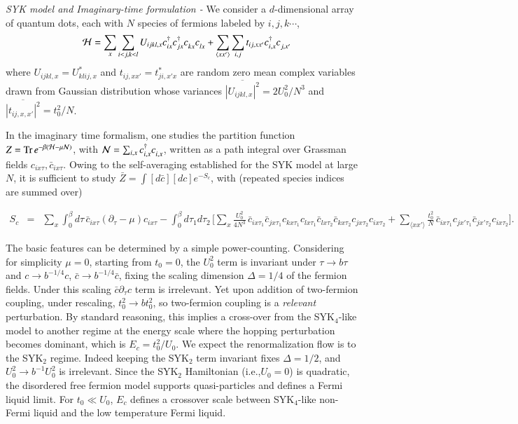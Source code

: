 \documentclass[twocolumn,floatfix,superscriptaddress]{revtex4-1}
\newcommand{\ket}{\rangle}
\newcommand{\bra}{\langle}
\begin{document}
\emph{SYK model and Imaginary-time formulation - }  We consider a $d$-dimensional array of quantum dots, each with  $N$ species of fermions labeled by $i,j,k\cdots$, 
\begin{eqnarray}
\label{hamiltonian}
&&\mathcal H=\sum_x \sum_{i<j,k<l} U_{ijkl,x}c_{ix}^\dagger c_{jx}^\dagger c^{\vphantom\dagger}_{kx}c^{\vphantom\dagger}_{lx}+\sum_{\bra xx'\ket} \sum_{i,j}t_{ij,xx'} c_{i,x}^\dagger c^{\vphantom\dagger}_{j,x'}
\end{eqnarray}
where $U_{ijkl,x}=U_{klij,x}^*$ and $t_{ij,xx'}=t_{ji,x'x}^*$ are random zero mean complex variables drawn from Gaussian distribution whose variances $\overline{|U_{ijkl,x}|^2} = 2 U_0^2/N^3$ and $\overline {|t_{ij,x,x'}|^2} = t_0^2/N$.  

In the imaginary time formalism, one studies the partition function $Z={\rm Tr}\, e^{-\beta (\mathcal{H}-\mu \mathcal{N})}$,  with $\mathcal{N} = \sum_{i,x} c_{i,x}^\dagger c_{i,x}^{\vphantom\dagger}$, written as a path integral over Grassman fields  $c_{ix\tau},\bar c_{ix\tau}$.  Owing to the self-averaging established for the SYK model at large $N$, it is sufficient to study $\bar{Z}= \int [d\bar{c}][dc] e^{-S_c}$, with (repeated species indices are summed over)
\begin{widetext}
  \begin{eqnarray}
    \label{eq:1}
    S_c & = & \sum_{x}\int_0^\beta \! d\tau \, \bar c_{ix\tau}(\partial_\tau - \mu) c_{ix\tau} - \int_0^\beta \! d\tau_1 d\tau_2 \,\Big[ \sum_x\frac{U_0^2}{4N^3} \,\bar{c}_{ix\tau_1} \bar{c}_{jx\tau_1}  c_{kx\tau_1} c_{lx\tau_1} \bar{c}_{lx\tau_2} \bar{c}_{kx\tau_2} c_{jx\tau_2} c_{ix\tau_2}  +\sum_{\bra xx'\ket} \frac{t_0^2}{N} \, \bar{c}_{ix\tau_1} c_{jx'\tau_1} \bar{c}_{jx'\tau_2} c_{ix\tau_2} \Big].
  \end{eqnarray}
\end{widetext}
The basic features can be determined by a simple power-counting.  Considering for simplicity $\mu=0$, starting from $t_0=0$, the $U_0^2$ term is invariant under $\tau \rightarrow b \tau$ and $c \rightarrow b^{-1/4} c$, $\bar{c}\rightarrow b^{-1/4} \bar{c}$, fixing the scaling dimension $\Delta=1/4$ of the fermion fields.  Under this scaling $\bar{c}\partial_\tau c$ term is irrelevant. Yet upon addition of two-fermion coupling, under rescaling, $t_0^2 \rightarrow b t_0^2$, so two-fermion coupling is a {\em relevant} perturbation.  By standard reasoning, this implies a cross-over from the SYK$_4$-like model to another regime at the energy scale where the hopping perturbation becomes dominant, which is $E_c = t_0^2/U_0$.  We expect the renormalization flow is to the SYK$_2$ regime.  Indeed keeping the SYK$_2$ term invariant fixes $\Delta = 1/2$, and $U_0^2 \rightarrow b^{-1} U_0^2$ is irrelevant.  Since the SYK$_2$ Hamiltonian (i.e.,$U_0=0$) is quadratic, the disordered free fermion model supports quasi-particles and defines a Fermi liquid limit.  For $t_0 \ll U_0$, $E_c$ defines a crossover scale between SYK$_4$-like non-Fermi liquid and the low temperature Fermi liquid.  
\end{document}
